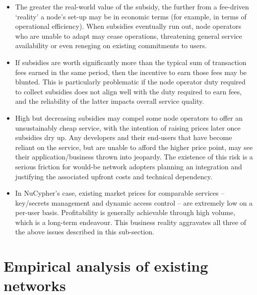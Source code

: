 \documentclass[8pt]{article}
\begin{document}
\begin{itemize}
\item The greater the real-world value of the subsidy, the further from a fee-driven `reality' a node's set-up may be in economic terms (for example, in terms of operational efficiency). When subsidies eventually run out, node operators who are unable to adapt may cease operations, threatening general service availability or even reneging on existing commitments to users. 
\item If subsidies are worth significantly more than the typical sum of transaction fees earned in the same period, then the incentive to earn those fees may be blunted. This is particularly problematic if the node operator duty required to collect subsidies does not align well with the duty required to earn fees, and the reliability of the latter impacts overall service quality. 
\item High but decreasing subsidies may compel some node operators to offer an unsustainably cheap service, with the intention of raising prices later once subsidies dry up. Any developers and their end-users that have become reliant on the service, but are unable to afford the higher price point, may see their application/business thrown into jeopardy. The existence of this risk is a serious friction for would-be network adopters planning an integration and justifying the associated upfront costs and technical dependency.
\item In NuCypher's case, existing market prices for comparable services – key/secrets management and dynamic access control – are extremely low on a per-user basis. Profitability is generally achievable through high volume, which is a long-term endeavour. This business reality aggravates all three of the above issues described in this sub-section.
\end{itemize}

\section{Empirical analysis of existing networks}
\end{document}

